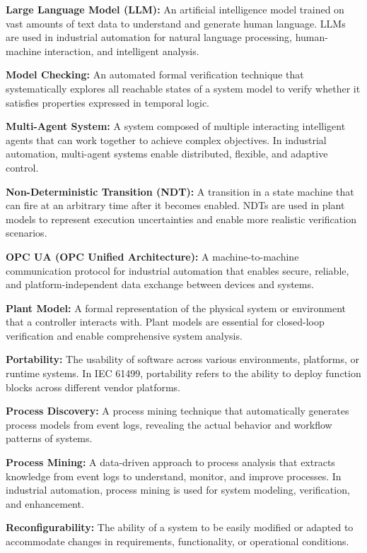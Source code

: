 \textbf{Large Language Model (LLM):} An artificial intelligence model trained on vast amounts of text data to understand and generate human language. LLMs are used in industrial automation for natural language processing, human-machine interaction, and intelligent analysis.

\textbf{Model Checking:} An automated formal verification technique that systematically explores all reachable states of a system model to verify whether it satisfies properties expressed in temporal logic.

\textbf{Multi-Agent System:} A system composed of multiple interacting intelligent agents that can work together to achieve complex objectives. In industrial automation, multi-agent systems enable distributed, flexible, and adaptive control.

\textbf{Non-Deterministic Transition (NDT):} A transition in a state machine that can fire at an arbitrary time after it becomes enabled. NDTs are used in plant models to represent execution uncertainties and enable more realistic verification scenarios.

\textbf{OPC UA (OPC Unified Architecture):} A machine-to-machine communication protocol for industrial automation that enables secure, reliable, and platform-independent data exchange between devices and systems.

\textbf{Plant Model:} A formal representation of the physical system or environment that a controller interacts with. Plant models are essential for closed-loop verification and enable comprehensive system analysis.

\textbf{Portability:} The usability of software across various environments, platforms, or runtime systems. In IEC 61499, portability refers to the ability to deploy function blocks across different vendor platforms.

\textbf{Process Discovery:} A process mining technique that automatically generates process models from event logs, revealing the actual behavior and workflow patterns of systems.

\textbf{Process Mining:} A data-driven approach to process analysis that extracts knowledge from event logs to understand, monitor, and improve processes. In industrial automation, process mining is used for system modeling, verification, and enhancement.

\textbf{Reconfigurability:} The ability of a system to be easily modified or adapted to accommodate changes in requirements, functionality, or operational conditions.

